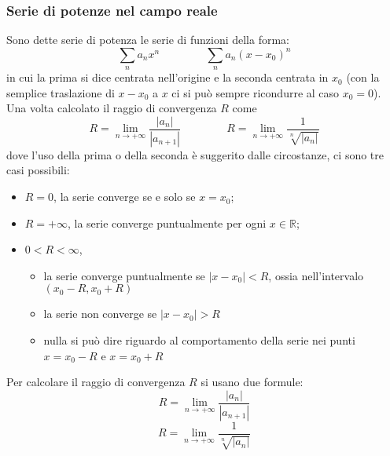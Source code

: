 \subsubsection{Serie di potenze nel campo reale}
Sono dette serie di potenza le serie di funzioni della forma:
\[
    \sum_{n} a_nx^n \;\;\;\;\;\;\;\;\;\;\;\;\;\;\;\sum_{n}a_n(x-x_0)^n
\]
in cui la prima si dice centrata nell'origine e la seconda centrata in $x_0$ (con la semplice traslazione di $x-x_0$ a $x$ ci si può sempre ricondurre al caso $x_0 = 0$).\newline
\newline
Una volta calcolato il raggio di convergenza $R$ come
\[
    R = \lim_{n\rightarrow +\infty} \frac{|a_n|}{|a_{n+1}|} \;\;\;\;\;\;\;\;\;\;\;\;\;\;\;R = \lim_{n\rightarrow +\infty} \frac{1}{\sqrt[n]{|a_n|}}
\] dove l'uso della prima o della seconda è suggerito dalle circostanze, ci sono tre casi possibili:
\begin{itemize}
    \item $R = 0$, la serie converge se e solo se $x = x_0$;
    \item $R = +\infty$, la serie converge puntualmente per ogni $x \in \mathbb{R}$;
    \item $0 < R < \infty$, \begin{itemize}
        \item la serie converge puntualmente se $|x-x_0| < R$, ossia nell'intervalo $(x_0-R, x_0 + R)$
        \item la serie non converge se $|x-x_0| > R$
        \item nulla si può dire riguardo al comportamento della serie nei punti $x = x_0 - R$ e $x= x_0+R$
    \end{itemize}
\end{itemize}
Per calcolare il raggio di convergenza $R$ si usano due formule:
\[
    R = \lim_{n\rightarrow +\infty} \frac{|a_n|}{|a_{n+1}|}
\]
\[
    R = \lim_{n\rightarrow +\infty} \frac{1}{\sqrt[n]{|a_n|}}
\]
